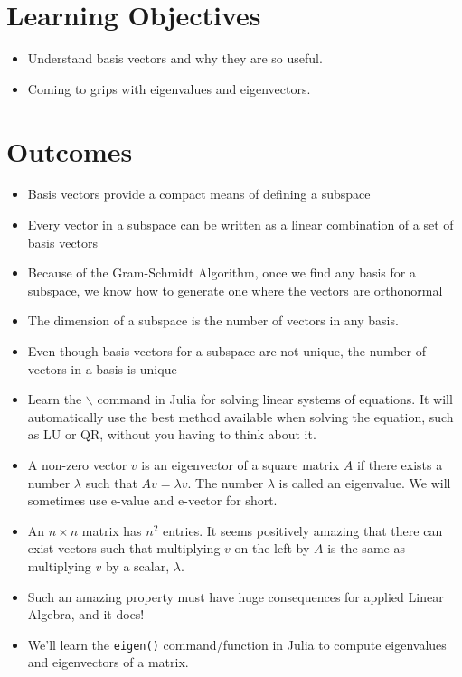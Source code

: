 \section*{Learning Objectives}

\begin{itemize}
\item Understand basis vectors and why they are so useful.
\item Coming to grips with eigenvalues and eigenvectors. 
\end{itemize}

\section*{Outcomes} 
\begin{itemize}
\item Basis vectors provide a compact means of defining a subspace
\item Every vector in a subspace can be written as a linear combination of a set of basis vectors
\item Because of the Gram-Schmidt Algorithm, once we find any basis for a subspace, we know how to generate one where the vectors are orthonormal
\item The dimension of a subspace is the number of vectors in any basis. 
\item Even though basis vectors for a subspace are not unique, the number of vectors in a basis is unique
\item Learn the \texttt{$\backslash$} command in Julia for solving linear systems of equations. It will automatically use the best method available when solving the equation, such as LU or QR, without you having to think about it.

\item A non-zero vector $v$ is an eigenvector of a square matrix $A$ if there exists a number $\lambda$ such that $Av = \lambda v$. The number $\lambda$ is called an eigenvalue. We will sometimes use e-value and e-vector for short.
\item An $n \times n$ matrix has $n^2$ entries. It seems positively amazing that there can exist vectors such that multiplying $v$ on the left by $A$ is the same as multiplying $v$ by a scalar, $\lambda$. 
\item Such an amazing property must have huge consequences for applied Linear Algebra, and it does!
\item  We'll learn the \texttt{eigen()} command/function in Julia to compute eigenvalues and eigenvectors of a matrix.
\end{itemize}

